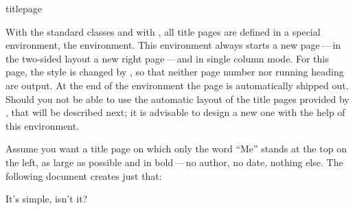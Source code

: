 \begin{Declaration}
  \begin{Environment}{titlepage}\end{Environment}%
\end{Declaration}%
With the standard classes and with {\KOMAScript}, all title pages are defined
in a special environment, the  environment.  This
environment always starts a new page\,---\,in the two-sided layout a new right
page\,---\,and in single column mode. For this page, the style is changed by
, so that neither page number nor
running heading are output. At the end of the environment the page is
automatically shipped out. Should you not be able to use the automatic layout
of the title pages provided by , that will be described next;
it is advisable to design a new one with the help of this environment.

\begin{Example}
  Assume you want a title page on which only the word ``Me'' stands at
  the top on the left, as large as possible and in bold\,---\,no
  author, no date, nothing else. The following document creates just
  that:
\ifCommonmaincls
{}
\else
{}
\fi
It's simple, isn't it?
\end{Example}
%
\EndIndexGroup


